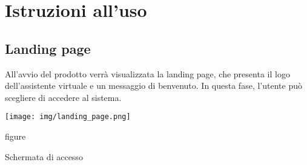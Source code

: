 \section{Istruzioni all'uso}

\subsection{Landing page}
All'avvio del prodotto verrà visualizzata la landing page, che presenta il logo dell'assistente virtuale e un messaggio di benvenuto. In questa fase, l'utente può scegliere di accedere al sistema.
\begin{center}
    \texttt{[image: img/landing\_page.png]}
    \caption{figure}{Schermata di accesso}
\end{center}